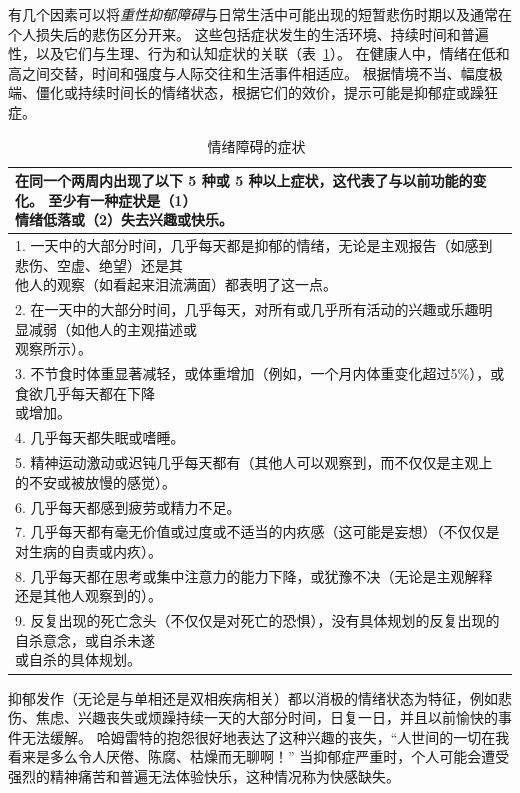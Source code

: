 有几个因素可以将\textit{重性抑郁障碍}与日常生活中可能出现的短暂悲伤时期以及通常在个人损失后的悲伤区分开来。
这些包括症状发生的生活环境、持续时间和普遍性，以及它们与生理、行为和认知症状的关联（表~\ref{tab:61_1}）。
在健康人中，情绪在低和高之间交替，时间和强度与人际交往和生活事件相适应。
根据情境不当、幅度极端、僵化或持续时间长的情绪状态，根据它们的效价，提示可能是抑郁症或躁狂症。


\begin{table}[htbp]
	\caption{情绪障碍的症状~\cite{vahia2013diagnostic} \label{tab:61_1}}
	\begin{tabular}{l}
		\toprule
		\makecell[l]{在同一个两周内出现了以下 5 种或 5 种以上症状，这代表了与以前功能的变化。
			至少有一种症状是（1） \\情绪低落或（2）失去兴趣或快乐。} \\
		\midrule
		\makecell[l]{1. 一天中的大部分时间，几乎每天都是抑郁的情绪，无论是主观报告（如感到悲伤、空虚、绝望）还是其\\他人的观察（如看起来泪流满面）都表明了这一点。}\\
		\makecell[l]{2. 在一天中的大部分时间，几乎每天，对所有或几乎所有活动的兴趣或乐趣明显减弱（如他人的主观描述或\\观察所示）。}\\
		\makecell[l]{3. 不节食时体重显著减轻，或体重增加（例如，一个月内体重变化超过5\%），或食欲几乎每天都在下降\\或增加。}\\
		4. 几乎每天都失眠或嗜睡。\\
		5. 精神运动激动或迟钝几乎每天都有（其他人可以观察到，而不仅仅是主观上的不安或被放慢的感觉）。  \\
		6. 几乎每天都感到疲劳或精力不足。\\
		7. 几乎每天都有毫无价值或过度或不适当的内疚感（这可能是妄想）（不仅仅是对生病的自责或内疚）。\\
		8. 几乎每天都在思考或集中注意力的能力下降，或犹豫不决（无论是主观解释还是其他人观察到的）。\\
		\makecell[l]{9. 反复出现的死亡念头（不仅仅是对死亡的恐惧），没有具体规划的反复出现的自杀意念，或自杀未遂\\或自杀的具体规划。} \\
		\bottomrule
	\end{tabular}
\end{table}


抑郁发作（无论是与单相还是双相疾病相关）都以消极的情绪状态为特征，例如悲伤、焦虑、兴趣丧失或烦躁持续一天的大部分时间，日复一日，并且以前愉快的事件无法缓解。
哈姆雷特的抱怨很好地表达了这种兴趣的丧失，“人世间的一切在我看来是多么令人厌倦、陈腐、枯燥而无聊啊！” 
当抑郁症严重时，个人可能会遭受强烈的精神痛苦和普遍无法体验快乐，这种情况称为快感缺失。


